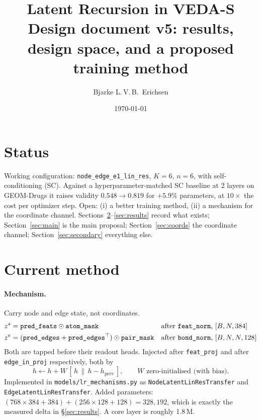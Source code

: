 \documentclass[11pt,a4paper]{article}
\title{Latent Recursion in VEDA-S\\\large Design document v5: results, design space, and a proposed training method}
\author{Bjarke L.\,V.\,B.\ Erichsen}
\date{\today}
\newcommand{\zs}{z^{s}}
\newcommand{\ze}{z^{e}}
\newcommand{\code}[1]{\texttt{#1}}
\begin{document}
\maketitle
\tableofcontents

\section{Status}

Working configuration: \code{node\_edge\_e1\_lin\_res}, $K{=}6$, $n{=}6$, with
self-conditioning (SC). Against a hyperparameter-matched SC baseline at 2 layers on
GEOM-Drugs it raises validity $0.548 \to 0.819$ for $+5.9\%$ parameters, at
$10\times$ the cost per optimizer step. Open: (i) a better training method, (ii) a mechanism for the coordinate
channel. Sections~\ref{sec:mech}--\ref{sec:results} record what exists;
Section~\ref{sec:main} is the main proposal; Section~\ref{sec:coords} the coordinate
channel; Section~\ref{sec:secondary} everything else.

\section{Current method}\label{sec:mech}

\paragraph{Mechanism.} Carry node and edge state, not coordinates.
\begin{align*}
  \zs &= \code{pred\_feats}\odot\code{atom\_mask} && \text{after \code{feat\_norm}, } [B,N,384]\\
  \ze &= (\code{pred\_edges}+\code{pred\_edges}^{\top})\odot\code{pair\_mask} && \text{after \code{bond\_norm}, } [B,N,N,128]
\end{align*}
Both are tapped before their readout heads. Injected after \code{feat\_proj} and after
\code{edge\_in\_proj} respectively, both by
\[
  h \leftarrow h + W\,[\,h \,\|\, h - h_{\text{prev}}\,], \qquad W \text{ zero-initialised (with bias).}
\]
Implemented in \code{models/lr\_mechanisms.py} as
\code{NodeLatentLinResTransfer} and \code{EdgeLatentLinResTransfer}.
Added parameters:
$(768{\times}384+384) + (256{\times}128+128) = 328{,}192$, which is exactly the measured
delta in \S\ref{sec:results}. A core layer is roughly 1.8\,M.
\end{document}
